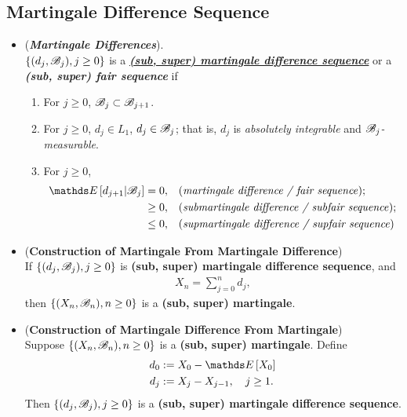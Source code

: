 \documentclass[11pt]{article}
\begin{document}
\subsection{Martingale Difference Sequence}
\begin{itemize}
\item \begin{definition} (\textbf{\emph{Martingale Differences}}).  \citep{resnick2013probability}\\
$\left\{(d_j, {\mathscr B}_j), j \ge 0\right\}$ is a \underline{\emph{\textbf{(sub, super) martingale difference sequence}}} or a \textit{\textbf{(sub, super) fair sequence}} if
\begin{enumerate}
\item For $j \ge 0$,  ${\mathscr B}_j \subset {\mathscr B}_{j+1}$.
\item For $j \ge 0$,  $d_j \in L_1$,  $d_j \in {\mathscr B}_j$; that is, $d_j$ is \emph{absolutely integrable} and \emph{${\mathscr B}_j$-measurable}.
\item For $j \ge 0$,
\begin{align*}
\E{}{d_{j+1} | \srB_j} &= 0, && \text{(\emph{martingale difference / fair sequence})};\\
& \ge 0, && \text{(\emph{submartingale difference / subfair sequence})};\\
& \le 0, && \text{(\emph{supmartingale difference / supfair sequence})}
\end{align*}
\end{enumerate}
\end{definition}

\item \begin{proposition} (\textbf{Construction of Martingale From Martingale Difference})\citep{resnick2013probability}\\
If $\left\{(d_j, {\mathscr B}_j), j \ge 0\right\}$ is \textbf{(sub, super) martingale difference sequence}, and
\begin{align*}
X_n = \sum_{j=0}^{n} d_j, 
\end{align*} then $\left\{(X_n, {\mathscr B}_n), n \ge 0\right\}$ is a \textbf{(sub, super) martingale}.
\end{proposition}

\item \begin{proposition} (\textbf{Construction of Martingale Difference From Martingale}) \citep{resnick2013probability}\\
Suppose $\left\{(X_n, {\mathscr B}_n), n \ge 0\right\}$ is a \textbf{(sub, super) martingale}. Define
\begin{align*}
d_0&:= X_0 - \E{}{X_0}\\
d_j &:= X_j - X_{j-1}, \quad j\ge 1.
\end{align*}
Then $\left\{(d_j, {\mathscr B}_j), j \ge 0\right\}$ is a \textbf{(sub, super) martingale difference sequence}.
\end{proposition}


\end{itemize}
\end{document}
